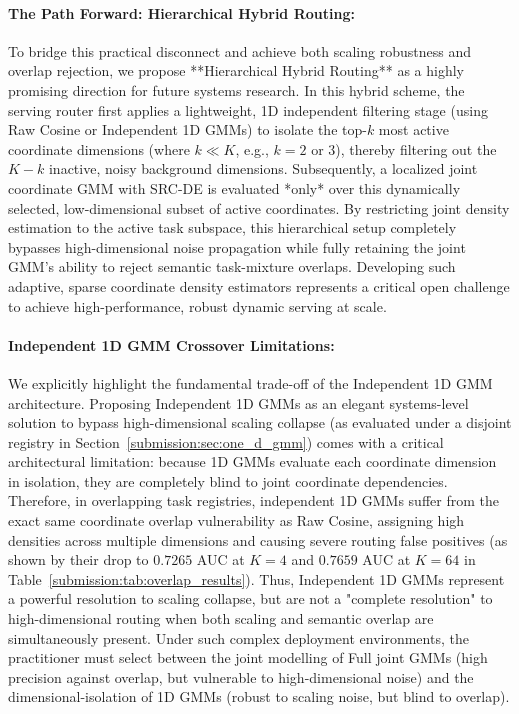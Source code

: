 \paragraph{The Path Forward: Hierarchical Hybrid Routing:} To bridge this practical disconnect and achieve both scaling robustness and overlap rejection, we propose **Hierarchical Hybrid Routing** as a highly promising direction for future systems research. In this hybrid scheme, the serving router first applies a lightweight, 1D independent filtering stage (using Raw Cosine or Independent 1D GMMs) to isolate the top-$k$ most active coordinate dimensions (where $k \ll K$, e.g., $k=2$ or $3$), thereby filtering out the $K-k$ inactive, noisy background dimensions. Subsequently, a localized joint coordinate GMM with SRC-DE is evaluated *only* over this dynamically selected, low-dimensional subset of active coordinates. By restricting joint density estimation to the active task subspace, this hierarchical setup completely bypasses high-dimensional noise propagation while fully retaining the joint GMM's ability to reject semantic task-mixture overlaps. Developing such adaptive, sparse coordinate density estimators represents a critical open challenge to achieve high-performance, robust dynamic serving at scale.

\paragraph{Independent 1D GMM Crossover Limitations:} We explicitly highlight the fundamental trade-off of the Independent 1D GMM architecture. Proposing Independent 1D GMMs as an elegant systems-level solution to bypass high-dimensional scaling collapse (as evaluated under a disjoint registry in Section~\ref{submission:sec:one_d_gmm}) comes with a critical architectural limitation: because 1D GMMs evaluate each coordinate dimension in isolation, they are completely blind to joint coordinate dependencies. Therefore, in overlapping task registries, independent 1D GMMs suffer from the exact same coordinate overlap vulnerability as Raw Cosine, assigning high densities across multiple dimensions and causing severe routing false positives (as shown by their drop to $0.7265$ AUC at $K=4$ and $0.7659$ AUC at $K=64$ in Table~\ref{submission:tab:overlap_results}). 
Thus, Independent 1D GMMs represent a powerful resolution to scaling collapse, but are not a "complete resolution" to high-dimensional routing when both scaling and semantic overlap are simultaneously present. Under such complex deployment environments, the practitioner must select between the joint modelling of Full joint GMMs (high precision against overlap, but vulnerable to high-dimensional noise) and the dimensional-isolation of 1D GMMs (robust to scaling noise, but blind to overlap).

